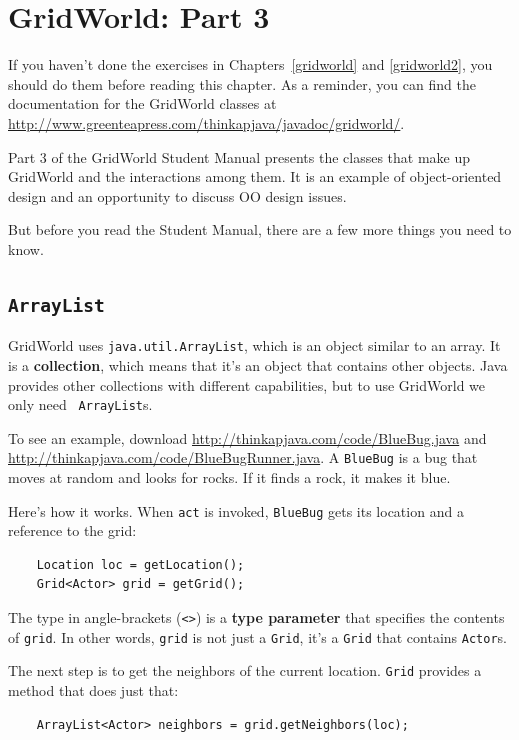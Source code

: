 \chapter{GridWorld: Part 3}
\label{gridworld3}

If you haven't done the exercises in Chapters~\ref{gridworld} and
\ref{gridworld2}, you should do them before reading this chapter.
As a reminder, you can find the
documentation for the GridWorld classes at
\url{http://www.greenteapress.com/thinkapjava/javadoc/gridworld/}.

Part 3 of the GridWorld Student Manual presents the classes that
make up GridWorld and the interactions among them.  It is an
example of object-oriented design and an opportunity to discuss OO
design issues.

But before you read the Student Manual, there are a few more things
you need to know.


\section{{\tt ArrayList}}

GridWorld uses {\tt java.util.ArrayList}, which is an object similar
to an array.  It is a {\bf collection}, which means that it's an
object that contains other objects.  Java provides other collections
with different capabilities, but to use GridWorld we only need {\tt
  ArrayList}s.

To see an example, download
\url{http://thinkapjava.com/code/BlueBug.java} and
\url{http://thinkapjava.com/code/BlueBugRunner.java}.
A {\tt BlueBug} is a bug that moves at random and looks for rocks.
If it finds a rock, it makes it blue.

Here's how it works.  When {\tt act} is invoked, {\tt BlueBug} gets
its location and a reference to the grid:

\begin{lstlisting}
    Location loc = getLocation();
    Grid<Actor> grid = getGrid();
\end{lstlisting}

The type in angle-brackets (\verb"<>") is a {\bf type parameter}
that specifies the contents of {\tt grid}.  In other words, {\tt grid}
is not just a {\tt Grid}, it's a {\tt Grid} that contains {\tt Actor}s.

The next step is to get the neighbors of the current location.
{\tt Grid} provides a method that does just that:

\begin{lstlisting}
    ArrayList<Actor> neighbors = grid.getNeighbors(loc);
\end{lstlisting}

